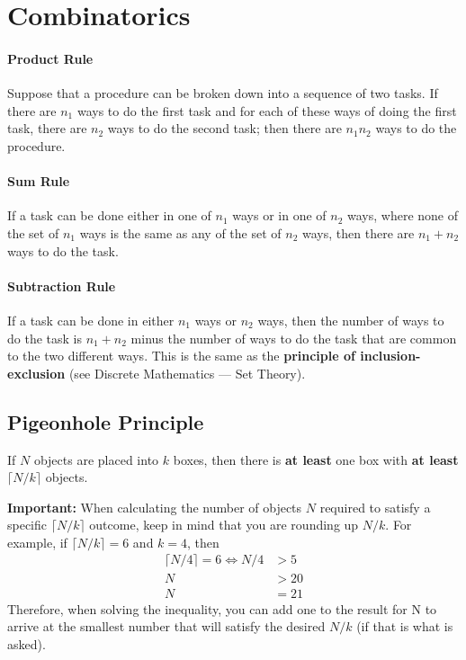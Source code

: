 \section{Combinatorics}
\paragraph{Product Rule} Suppose that a procedure can be broken down into a sequence of two tasks. If there are \( n_1 \)  ways to do the first task and for each of these ways of doing the first task, there are \( n_2 \) ways to do the second task; then there are \( n_1 n_2 \)  ways to do the procedure.
\paragraph{Sum Rule} 
If a task can be done either in one of \( n_1 \)  ways or in one of \( n_2 \) ways, where none of the set of \( n_1 \) ways is the same as any of the set of \( n_2 \) ways, then there are \( n_1 + n_2 \) ways to do the task.
\paragraph{Subtraction Rule} 
If a task can be done in either \( n_1 \) ways or \( n_2 \) ways, then the number of ways to do the task is \( n_1 + n_2 \) minus the number of ways to do the task that are common to the two different ways. This is the same as the \textbf{principle of inclusion-exclusion} (see Discrete Mathematics --- Set Theory).
\subsection{Pigeonhole Principle}
If \( N \) objects are placed into \( k \) boxes, then there is \textbf{at least} one box with \textbf{at least} \(\lceil N/k \rceil \) objects.

\textbf{Important:} When calculating the number of objects \( N \)  required to satisfy a specific \(\lceil N/k \rceil \) outcome, keep in mind that you are rounding up \( N/k \). For example, if \( \lceil N/k \rceil = 6 \) and \( k = 4 \), then 
\begin{align*}
	\lceil N/4 \rceil = 6 \Leftrightarrow N/4 &> 5\\
	N &> 20 \\
	N &= 21
\end{align*}
Therefore, when solving the inequality, you can add one to the result for N to arrive at the smallest number that will satisfy the desired \( N/k \) (if that is what is asked). 

